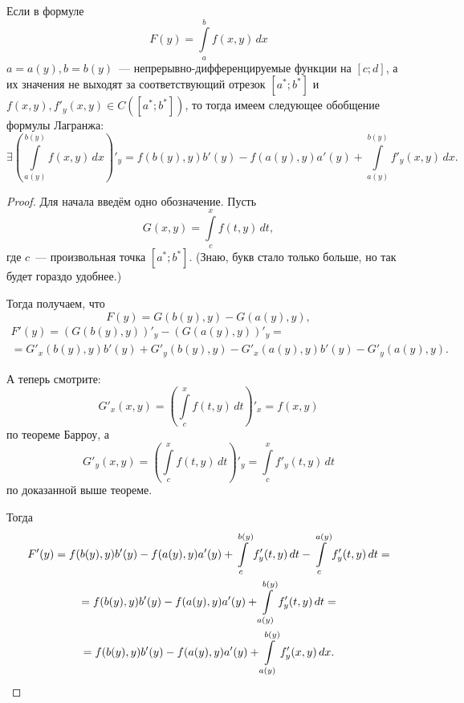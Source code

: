 \documentclass[../../main.tex]{subfiles}
\begin{document}
\begin{rem}
	Если в формуле
	\[F(y) = \int\limits_a^b f(x, y)\,dx\]
	$a = a(y), b = b(y)$~--- непрерывно-дифференцируемые функции на $[c; d]$,
	а их значения не выходят за соответствующий отрезок $[a^*;b^*]$ и $f(x, y),
	f'_y(x, y)\in C([a^*; b^*])$, то тогда имеем следующее 
	обобщение формулы Лагранжа:
	\[\exists \left(\int\limits_{a(y)}^{b(y)} f(x, y)\,dx\right)'_y = 
	f(b(y), y)b'(y) - f(a(y), y)a'(y) + 
	\int\limits_{a(y)}^{b(y)}f'_y(x, y)\,dx.\]
\end{rem}

\begin{proof}
	Для начала введём одно обозначение. Пусть
	\[G(x, y) = \int\limits_c^x f(t, y)\,dt,\]
	где $c$~--- произвольная точка $[a^*;b^*]$. 
	(Знаю, букв стало только больше, но так будет гораздо удобнее.)
	
	Тогда получаем, что
	\[F(y) = G(b(y), y) - G(a(y), y),\]
	\begin{gather*}
		F'(y) = \left(G(b(y), y)\right)'_y -\left(G(a(y), y)\right)'_y =\\
		= G'_x(b(y), y)b'(y) + G'_y(b(y), y) - G'_x(a(y), y)b'(y) - 
		G'_y(a(y), y).
	\end{gather*}
	
	А теперь смотрите:
	\[G'_x(x, y) = \left(\int\limits_c^x f(t, y)\,dt\right)'_x = f(x, y)\]
	по теореме Барроу, а
	\[G'_y(x, y) = \left(\int\limits_c^x f(t, y)\,dt\right)'_y =
	\int\limits_c^x f'_y(t, y)\,dt\]
	по доказанной выше теореме.
	
	Тогда
	\begin{gather*}
		F'(y) = f(b(y), y)b'(y) - f(a(y), y)a'(y) + 
		\int\limits_c^{b(y)} f'_y(t, y)\,dt - 
		\int\limits_c^{a(y)} f'_y(t, y)\,dt =\\
		= f(b(y), y)b'(y) - f(a(y), y)a'(y) + 
		\int\limits_{a(y)}^{b(y)} f'_y(t, y)\,dt =\\
		= f(b(y), y)b'(y) - f(a(y), y)a'(y) + 
		\int\limits_{a(y)}^{b(y)} f'_y(x, y)\,dx. \qedhere
	\end{gather*}
\end{proof}
\end{document}
